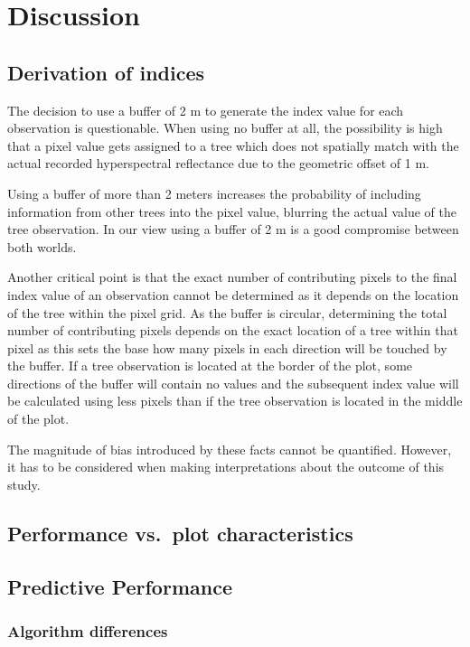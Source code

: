 \documentclass[letterpaper, peerreview]{IEEEtran}
\begin{document}
\section{Discussion}

\subsection{Derivation of indices}

\noindent The decision to use a buffer of 2 m to generate the index value for each observation is questionable.
When using no buffer at all, the possibility is high that a pixel value gets assigned to a tree which does not spatially match with the actual recorded hyperspectral reflectance due to the geometric offset of 1 m.

Using a buffer of more than 2 meters increases the probability of including information from other trees into the pixel value, blurring the actual value of the tree observation.
In our view using a buffer of 2 m is a good compromise between both worlds.

Another critical point is that the exact number of contributing pixels to the final index value of an observation cannot be determined as it depends on the location of the tree within the pixel grid.
As the buffer is circular, determining the total number of contributing pixels depends on the exact location of a tree within that pixel as this sets the base how many pixels in each direction will be touched by the buffer.
If a tree observation is located at the border of the plot, some directions of the buffer will contain no values and the subsequent index value will be calculated using less pixels than if the tree observation is located in the middle of the plot.

The magnitude of bias introduced by these facts cannot be quantified.
However, it has to be considered when making interpretations about the outcome of this study.

\subsection{Performance vs.\ plot characteristics}

\subsection{Predictive Performance}

\subsubsection{Algorithm differences}
\end{document}
